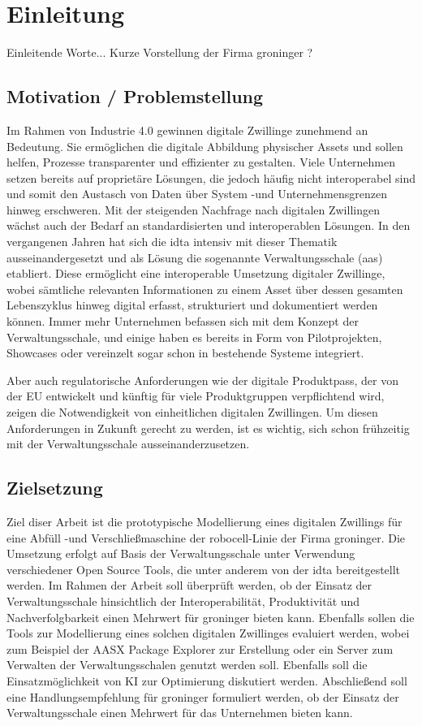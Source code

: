 \section{Einleitung}
Einleitende Worte...
Kurze Vorstellung der Firma groninger ?
\subsection{Motivation / Problemstellung}
\label{sec:Motivation}
Im Rahmen von Industrie 4.0 gewinnen digitale Zwillinge zunehmend an Bedeutung. 
Sie ermöglichen die digitale Abbildung physischer Assets und sollen helfen, Prozesse transparenter und effizienter zu gestalten.
Viele Unternehmen setzen bereits auf proprietäre Lösungen, die jedoch häufig nicht interoperabel sind und somit den Austasch von Daten über System -und Unternehmensgrenzen hinweg erschweren.
Mit der steigenden Nachfrage nach digitalen Zwillingen wächst auch der Bedarf an standardisierten und interoperablen Lösungen.
In den vergangenen Jahren hat sich die \ac{idta} intensiv mit dieser Thematik ausseinandergesetzt und als Lösung die sogenannte Verwaltungsschale (\ac{aas}) etabliert.
Diese ermöglicht eine interoperable Umsetzung digitaler Zwillinge, wobei sämtliche relevanten Informationen zu einem Asset über dessen gesamten Lebenszyklus hinweg digital erfasst, strukturiert und dokumentiert werden können. 
Immer mehr Unternehmen befassen sich mit dem Konzept der Verwaltungsschale, und einige haben es bereits in Form von Pilotprojekten, Showcases oder vereinzelt sogar schon in bestehende Systeme integriert.

Aber auch regulatorische Anforderungen wie der digitale Produktpass, der von der EU entwickelt und künftig für viele Produktgruppen verpflichtend wird, zeigen die Notwendigkeit von einheitlichen digitalen Zwillingen. 
Um diesen Anforderungen in Zukunft gerecht zu werden, ist es wichtig, sich schon frühzeitig mit der Verwaltungsschale ausseinanderzusetzen.
\subsection{Zielsetzung}
Ziel diser Arbeit ist die prototypische Modellierung eines digitalen Zwillings für eine Abfüll -und Verschließmaschine der robocell-Linie der Firma groninger.
Die Umsetzung erfolgt auf Basis der Verwaltungsschale unter Verwendung verschiedener Open Source Tools, die unter anderem von der \acs{idta} bereitgestellt werden. 
Im Rahmen der Arbeit soll überprüft werden, ob der Einsatz der Verwaltungsschale hinsichtlich der Interoperabilität, Produktivität und Nachverfolgbarkeit einen Mehrwert für groninger bieten kann.
Ebenfalls sollen die Tools zur Modellierung eines solchen digitalen Zwillinges evaluiert werden, wobei zum Beispiel der AASX Package Explorer zur Erstellung oder ein Server zum Verwalten der Verwaltungsschalen genutzt werden soll.
Ebenfalls soll die Einsatzmöglichkeit von KI zur Optimierung diskutiert werden.
Abschließend soll eine Handlungsempfehlung für groninger formuliert werden, ob der Einsatz der Verwaltungsschale einen Mehrwert für das Unternehmen bieten kann.
